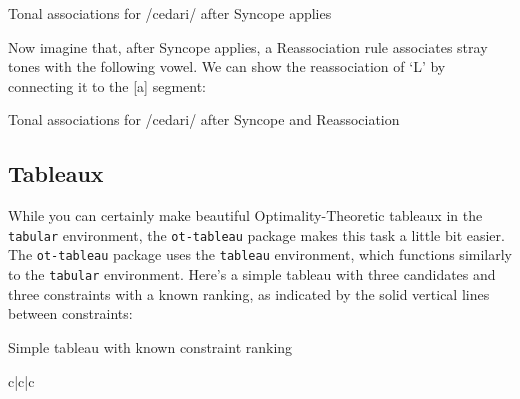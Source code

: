 \documentclass{article}
\begin{document}
\ea Tonal associations for /cedari/ after Syncope applies

\z

\noindent Now imagine that, after Syncope applies, a Reassociation rule associates stray tones with the following vowel. We can show the reassociation of `L' by connecting it to the [a] segment:

\ea Tonal associations for /cedari/ after Syncope and Reassociation

\z

\subsection{Tableaux}
While you can certainly make beautiful Optimality-Theoretic tableaux in the \texttt{tabular} environment, the \texttt{ot-tableau} package makes this task a little bit easier. The \texttt{ot-tableau} package uses the \texttt{tableau} environment, which functions similarly to the \texttt{tabular} environment. Here's a simple tableau with three candidates and three constraints with a known ranking, as indicated by the solid vertical lines between constraints:

\ea Simple tableau with known constraint ranking

\begin{tableau}{c|c|c} 
 \vio{*!} \vio{} \vio{} 
 \vio{} \vio{} \vio{*}
 \vio{} \vio{*!} \vio{}
\end{tableau}
\z
\end{document}
